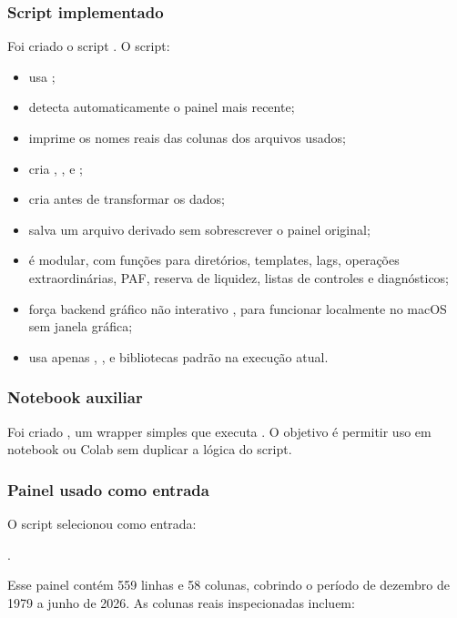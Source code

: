 \documentclass[12pt,a4paper]{article}
\begin{document}
\subsubsection{Script implementado}

Foi criado o script . O script:

\begin{itemize}[leftmargin=1.2cm]
    \item usa ;
    \item detecta automaticamente o painel mais recente;
    \item imprime os nomes reais das colunas dos arquivos usados;
    \item cria , ,
     e ;
    \item cria  antes de transformar os dados;
    \item salva um arquivo derivado sem sobrescrever o painel original;
    \item é modular, com funções para diretórios, templates, lags, operações
    extraordinárias, PAF, reserva de liquidez, listas de controles e diagnósticos;
    \item força backend gráfico não interativo , para funcionar localmente
    no macOS sem janela gráfica;
    \item usa apenas , ,  e bibliotecas
    padrão na execução atual.
\end{itemize}

\subsubsection{Notebook auxiliar}

Foi criado , um wrapper simples que executa
. O objetivo é permitir uso em notebook ou Colab
sem duplicar a lógica do script.

\subsubsection{Painel usado como entrada}

O script selecionou como entrada:
\begin{center}
.
\end{center}
Esse painel contém 559 linhas e 58 colunas, cobrindo o período de dezembro de 1979
a junho de 2026. As colunas reais inspecionadas incluem:
\end{document}
